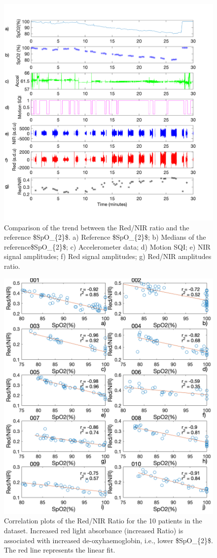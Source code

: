 \begin{figure}
\centering
\includegraphics[width = 11 cm]{./figures/SpO2_Series_003.png}
    \caption[Comparison of the trend between the Red/NIR ratio and the reference \gls{$SpO_{2}$}.]{Comparison of the trend between the Red/NIR ratio and the reference \gls{$SpO_{2}$}. a) Reference \gls{$SpO_{2}$}; b) Medians of the reference\gls{$SpO_{2}$}; c) Accelerometer data; d) Motion SQI;  e) NIR signal amplitudes; f) Red signal amplitudes; g) Red/NIR amplitudes ratio.} \label{spo2series}
\end{figure}



\begin{figure}
    \centering
\includegraphics[width = 10 cm]{./figures/scatter_plot_1.png}
    \caption[Correlation plots of the Red/NIR Ratio for the 10 patients in the dataset.]{Correlation plots of the Red/NIR Ratio for the 10 patients in the dataset. Increased red light absorbance (increased Ratio) is associated with increased de-oxyhaemoglobin, i.e., lower \gls{$SpO_{2}$}. The red line represents the linear fit.}
    \label{spo2_scatter} 
\end{figure}


